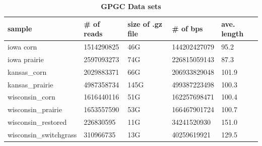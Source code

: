 \begin{table}[h]
\caption{\bf{GPGC Data sets}}
\label{my-label}
\begin{tabular}{|l|l|l|l|l|}
\hline
sample & \# of reads & size of .gz file & \# of bps & ave. length \\ \hline
iowa corn & 1514290825 & 46G & 144202427079 & 95.2 \\ \hline
iowa prairie & 2597093273 & 74G & 226815059143 & 87.3 \\ \hline
kansas\_corn & 2029883371 & 66G & 206933829048 & 101.9 \\ \hline
kansas\_prairie & 4987358734 & 145G & 499387223498 & 100.3 \\ \hline
wisconsin\_corn & 1616440116 & 51G & 162257698471 & 100.4 \\ \hline
wisconsin\_prairie & 1653557590 & 53G & 166467901724 & 100.7 \\ \hline
wisconsin\_restored & 226830595 & 11G & 34241520930 & 151.0 \\ \hline
wisconsin\_switchgrass & 310966735 & 13G & 40259619921 & 129.5 \\ \hline
\end{tabular}
\label{table:gpgc}
\end{table}

